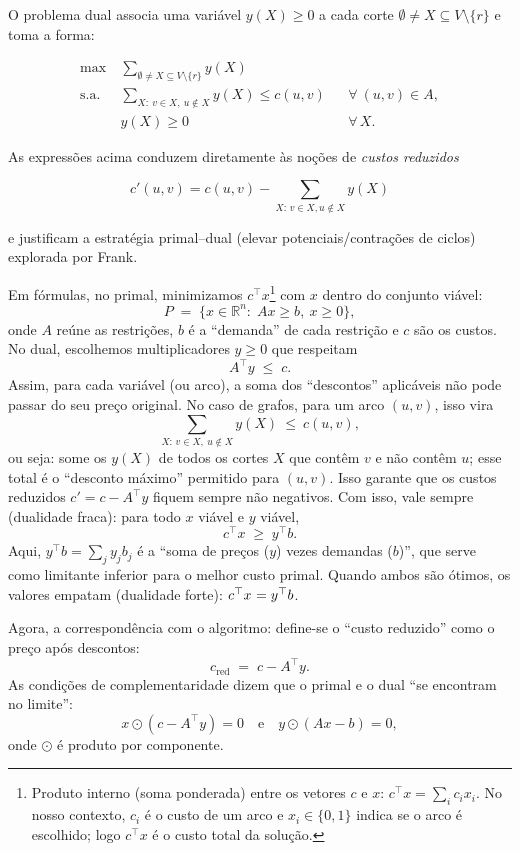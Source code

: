 O problema dual associa uma variável \(y(X)\ge 0\) a cada corte \(\emptyset\neq X\subseteq V\setminus\{r\}\) e toma a forma:

\[
	\begin{aligned}
		\max\          & \sum_{\emptyset\neq X\subseteq V\setminus\{r\}} y(X)                           \\[4pt]
		\text{s.a. }\  & \sum_{X:\ v\in X,\ u\notin X} y(X) \le c(u,v)        &  & \forall\ (u,v)\in A, \\[4pt]
		               & y(X)\ge 0                                            &  & \forall\,X.
	\end{aligned}
\]

As expressões acima conduzem diretamente às noções de \emph{custos reduzidos}

\[
	c'(u,v)=c(u,v)-\sum_{X:\,v\in X,u\notin X}y(X)
\]

e justificam a estratégia primal–dual (elevar potenciais/contrações de ciclos) explorada por Frank.


Em fórmulas, no primal, minimizamos \(c^\top x\)\footnote{Produto interno (soma ponderada) entre os vetores \(c\) e \(x\): \(c^\top x=\sum_i c_i x_i\). No nosso contexto, \(c_i\) é o custo de um arco e \(x_i\in\{0,1\}\) indica se o arco é escolhido; logo \(c^\top x\) é o custo total da solução.} com \(x\) dentro do conjunto viável:
\[
	P\;=\;\{x\in\mathbb{R}^n:\; Ax\ge b,\ x\ge 0\},
\]
onde \(A\) reúne as restrições, \(b\) é a “demanda” de cada restrição e \(c\) são os custos. No dual, escolhemos multiplicadores \(y\ge 0\) que respeitam
\[
	A^\top y\;\le\; c.
\]
Assim, para cada variável (ou arco), a soma dos “descontos” aplicáveis não pode passar do seu preço original. No caso de grafos, para um arco \((u,v)\), isso vira
\[
	\sum_{X:\, v\in X,\ u\notin X} y(X)\ \le\ c(u,v),
\]
ou seja: some os \(y(X)\) de todos os cortes \(X\) que contêm \(v\) e não contêm \(u\); esse total é o “desconto máximo” permitido para \((u,v)\). Isso garante que os custos reduzidos \(c' = c - A^\top y\) fiquem sempre não negativos.
Com isso, vale sempre (dualidade fraca): para todo \(x\) viável e \(y\) viável,
\[
	c^\top x\;\ge\; y^\top b.
\]
Aqui, \(y^\top b=\sum_j y_j b_j\) é a “soma de preços (\(y\)) vezes demandas (\(b\))”, que serve como limitante inferior para o melhor custo primal.
Quando ambos são ótimos, os valores empatam (dualidade forte): \(c^\top x^{\*}=y^{\*\top} b\).


Agora, a correspondência com o algoritmo: define-se o “custo reduzido” como o preço após descontos:
\[
	c_{\text{red}}\;=\;c - A^\top y.
\]
As condições de complementaridade dizem que o primal e o dual “se encontram no limite”:
\[
	x\odot(c - A^\top y)=0\quad\text{e}\quad y\odot(Ax-b)=0,
\]
onde \(\odot\) é produto por componente.


